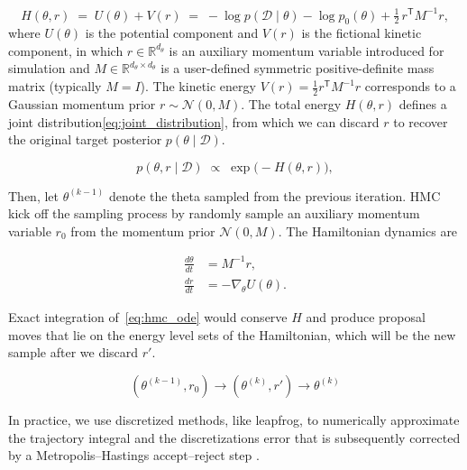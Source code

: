 \documentclass[preprint,12pt]{elsarticle}
\begin{document}
\begin{equation}
  H(\theta, r)
  \;=\;
  U(\theta) + V(r)
  \;=\;
  -\log p(\mathcal D \mid \theta)
  - \log p_0(\theta)
  + \tfrac{1}{2}\, r^{\mathsf{T}} M^{-1} r,
  \label{eq:hamiltonian_full}
\end{equation}
\noindent
where $U(\theta)$ is the potential component and $V(r)$ is the fictional kinetic component, in which \( r \in \mathbb{R}^{d_\theta} \) is an auxiliary momentum variable introduced for simulation and \( M \in \mathbb{R}^{d_\theta \times d_\theta} \) is a user-defined symmetric positive-definite mass matrix (typically \( M = I \)). The kinetic energy \( V(r) = \tfrac{1}{2} r^{\mathsf T} M^{-1} r \) corresponds to a Gaussian momentum prior \( r \sim \mathcal{N}(0, M) \). The total energy \( H(\theta, r) \) defines a joint distribution\eqref{eq:joint_distribution}, from which we can discard \( r \) to recover the original target posterior \( p(\theta \mid \mathcal D) \).

\begin{equation}
  p(\theta, r \mid \mathcal D)
  \;\propto\;
  \exp\bigl(-H(\theta, r)\bigr),
  \label{eq:joint_distribution}
\end{equation}

Then, let $\theta^{(k-1)}$ denote the theta sampled from the previous iteration. HMC kick off the sampling process by randomly sample an auxiliary momentum variable $r_0$ from the momentum prior $\mathcal N(0, M)$. The Hamiltonian dynamics are

\begin{subequations}
\label{eq:hmc_ode}
\begin{align}
  \frac{d\theta}{dt} &= M^{-1} r, \label{eq:hmc_ode_theta}\\
  \frac{dr}{dt}      &= -\nabla_{\!\theta} U(\theta). \label{eq:hmc_ode_r}
\end{align}
\end{subequations}


Exact integration of~\eqref{eq:hmc_ode} would conserve $H$ and produce
proposal moves that lie on the energy level sets of the Hamiltonian, which will be the new sample after we discard $r'$. 

\begin{equation}
    (\theta^{(k-1)}, r_0) \rightarrow (\theta^{(k)}, r') \rightarrow \theta^{(k)}
\end{equation}

\noindent
In practice, we use discretized methods, like leapfrog, to numerically approximate the trajectory integral and the discretizations error that is subsequently corrected by a Metropolis–Hastings accept–reject step .
\end{document}
